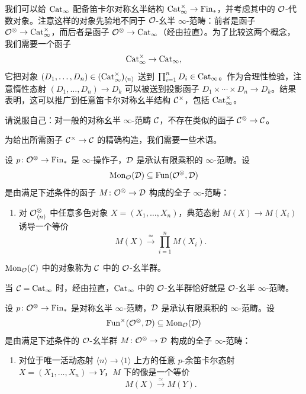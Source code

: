 \nitem\label{L25-1.5} 我们可以给 $\operatorname{Cat}_{\infty}$ 配备笛卡尔对称幺半结构 $\operatorname{Cat}^{\times}_{\infty}\to\mathrm{Fin}_{*}$，并考虑其中的 $\mathcal{O}$-代数对象。注意这样的对象先验地不同于 $\mathcal{O}$-幺半 $\infty$-范畴：前者是函子 $\mathcal{O}^{\otimes}\to\operatorname{Cat}^{\times}_{\infty}$，而后者是函子 $\mathcal{O}^{\otimes}\to\operatorname{Cat}_{\infty}$（经由拉直）。为了比较这两个概念，我们需要一个函子
\[
\operatorname{Cat}^{\times}_{\infty}\to\operatorname{Cat}_{\infty},
\]
它把对象 $(D_{1},\dots,D_{n})\in(\operatorname{Cat}^{\times}_{\infty})_{\langle n\rangle}$ 送到 $\prod_{i=1}^{n}D_{i}\in\operatorname{Cat}_{\infty}$。作为合理性检验，注意惰性态射 $(D_{1},\dots,D_{n})\to D_{k}$ 可以被送到投影函子 $D_{1}\times\cdots\times D_{n}\to D_{k}$。结果表明，这可以推广到任意笛卡尔对称幺半结构 $\mathcal{C}^{\times}$，包括 $\operatorname{Cat}^{\times}_{\infty}$。

\begin{exercise}\label{L25-1.6}
请说服自己：对一般的对称幺半 $\infty$-范畴 $\mathcal{C}$，不存在类似的函子 $\mathcal{C}^{\otimes}\to\mathcal{C}$。
\end{exercise}

\nitem\label{L25-1.7} 为给出所需函子 $\mathcal{C}^{\times}\to\mathcal{C}$ 的精确构造，我们需要一些术语。

\begin{definition}\label{L25-1.8}
设 $p\colon\mathcal{O}^{\otimes}\to\mathrm{Fin}_{*}$ 是 $\infty$-操作子，$\mathcal{D}$ 是承认有限乘积的 $\infty$-范畴。设
\[
\operatorname{Mon}_{\mathcal{O}}(\mathcal{D})\subseteq\operatorname{Fun}(\mathcal{O}^{\otimes},\mathcal{D})
\]
是由满足下述条件的函子 $M\colon\mathcal{O}^{\otimes}\to\mathcal{D}$ 构成的全子 $\infty$-范畴：
\begin{enumerate}[label=(\roman*),leftmargin=2.4em,itemsep=0.1em]
\item 对 $\mathcal{O}^{\otimes}_{\langle n\rangle}$ 中任意多色对象 $X=(X_{1},\dots,X_{n})$，典范态射 $M(X)\to M(X_{i})$ 诱导一个等价
\[
M(X)\xrightarrow{\ \simeq\ }\prod_{i=1}^{n}M(X_{i}).
\]
\end{enumerate}
$\operatorname{Mon}_{\mathcal{O}}(\mathcal{C})$ 中的对象称为 $\mathcal{C}$ 中的 $\mathcal{O}$-幺半群。
\end{definition}

\begin{example}\label{L25-1.9}
当 $\mathcal{C}=\operatorname{Cat}_{\infty}$ 时，经由拉直，$\operatorname{Cat}_{\infty}$ 中的 $\mathcal{O}$-幺半群恰好就是 $\mathcal{O}$-幺半 $\infty$-范畴。
\end{example}

\begin{definition}\label{L25-1.10}
设 $p\colon\mathcal{O}^{\otimes}\to\mathrm{Fin}_{*}$ 是对称幺半 $\infty$-范畴，$\mathcal{D}$ 是承认有限乘积的 $\infty$-范畴。设
\[
\operatorname{Fun}^{\times}(\mathcal{O}^{\otimes},\mathcal{D})\subseteq\operatorname{Mon}_{\mathcal{O}}(\mathcal{D})
\]
是由满足下述条件的 $\mathcal{O}$-幺半群 $M\colon\mathcal{O}^{\otimes}\to\mathcal{D}$ 构成的全子 $\infty$-范畴：
\begin{enumerate}[label=(\roman*),start=2,leftmargin=2.4em,itemsep=0.1em]
\item 对位于唯一活动态射 $\langle n\rangle\to\langle1\rangle$ 上方的任意 $p$-余笛卡尔态射 $X=(X_{1},\dots,X_{n})\to Y$，$M$ 下的像是一个等价
\[
M(X)\xrightarrow{\ \simeq\ }M(Y).
\]
\end{enumerate}
\end{definition}

